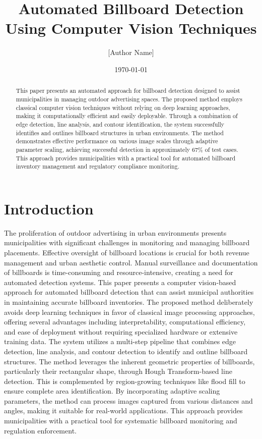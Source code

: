 \documentclass[12pt]{article}
\title{Automated Billboard Detection Using Computer Vision Techniques}
\author{[Author Name]}
\date{\today}
\begin{document}
\maketitle

\begin{abstract}
This paper presents an automated approach for billboard detection designed to assist municipalities in managing outdoor advertising spaces. The proposed method employs classical computer vision techniques without relying on deep learning approaches, making it computationally efficient and easily deployable. Through a combination of edge detection, line analysis, and contour identification, the system successfully identifies and outlines billboard structures in urban environments. The method demonstrates effective performance on various image scales through adaptive parameter scaling, achieving successful detection in approximately 67\% of test cases. This approach provides municipalities with a practical tool for automated billboard inventory management and regulatory compliance monitoring.
\end{abstract}

\section{Introduction}
The proliferation of outdoor advertising in urban environments presents municipalities with significant challenges in monitoring and managing billboard placements. Effective oversight of billboard locations is crucial for both revenue management and urban aesthetic control. Manual surveillance and documentation of billboards is time-consuming and resource-intensive, creating a need for automated detection systems.
This paper presents a computer vision-based approach for automated billboard detection that can assist municipal authorities in maintaining accurate billboard inventories. The proposed method deliberately avoids deep learning techniques in favor of classical image processing approaches, offering several advantages including interpretability, computational efficiency, and ease of deployment without requiring specialized hardware or extensive training data.
The system utilizes a multi-step pipeline that combines edge detection, line analysis, and contour detection to identify and outline billboard structures. The method leverages the inherent geometric properties of billboards, particularly their rectangular shape, through Hough Transform-based line detection. This is complemented by region-growing techniques like flood fill to ensure complete area identification. By incorporating adaptive scaling parameters, the method can process images captured from various distances and angles, making it suitable for real-world applications. This approach provides municipalities with a practical tool for systematic billboard monitoring and regulation enforcement.
\end{document}
